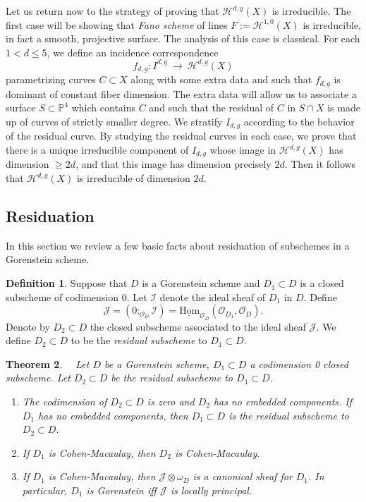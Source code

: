 \documentclass[twoside,12pt,reqno]{amsart}
\theoremstyle{plain}
\newtheorem{thm}{Theorem}[section]
\theoremstyle{definition}
\newtheorem{defn}[thm]{Definition}
\newcommand{\Hdg}[2]{\mathcal{H}^{#1,#2}}
\newcommand{\PP}{\mathbb{P}}
\def\ps{\vspace{4pt}}
\newcommand{\OO}{\mathcal O}
\begin{document}
\ps

Let us return now to the strategy of proving that $\Hdg{d}{g}(X)$ is
irreducible.  The first case will be showing that \emph{Fano scheme}
of lines $F:=\Hdg{1}{0}(X)$ is irreducible, in fact a smooth,
projective surface.  The analysis of this case is classical.  For each 
$1<d \leq 5$, we define an incidence correspondence
\begin{equation}
f_{d,g}:I^{d,g}~\rightarrow~\Hdg{d}{g}(X)
\end{equation}
parametrizing curves $C\subset X$ along with some extra data and 
such that $f_{d,g}$ is dominant of constant fiber dimension.  The
extra data will  
allow us to associate a surface $S\subset \PP^4$ which contains $C$
and such that the residual of $C$ in $S\cap X$ is made up of curves of 
strictly smaller degree.  We stratify $I_{d,g}$ according to the
behavior of the residual curve.  By studying the residual curves in
each case, we prove that there is a unique irreducible component of
$I_{d,g}$ whose image in $\Hdg{d}{g}(X)$ has dimension $\geq 2d$, and
that this image has dimension precisely $2d$.  Then it follows that
$\Hdg{d}{g}(X)$ is irreducible of dimension $2d$.

\subsection{Residuation} \label{sec-res}
In this section we review a few basic facts about residuation of
subschemes in a Gorenstein scheme.  

\ps

\begin{defn}  Suppose that $D$ is a Gorenstein scheme and
$D_1\subset D$ is a closed subscheme of codimension 0.  Let
$\mathcal{I}$ denote the ideal sheaf of $D_1$ in $D$.  Define
\begin{equation}
\mathcal{J} = (0:_{\OO_D} \mathcal{I}) =
\underline{\text{Hom}}_{\OO_D}( \OO_{D_1}, \OO_D).
\end{equation}  
Denote by
$D_2\subset D$ the closed subscheme associated to the ideal sheaf
$\mathcal{J}$.  We define $D_2\subset D$ to be the \emph{residual
subscheme} to $D_1\subset D$.  
\end{defn}

\ps

\begin{thm}~\cite[theorem 21.23]{E}~\label{thm-link}  Let $D$ be a
Gorenstein scheme, $D_1\subset D$ a codimension 0 closed subscheme.
Let $D_2\subset D$ be the residual subscheme to $D_1\subset D$.
\begin{enumerate}
\item The codimension of $D_2\subset D$ is zero and $D_2$ has no
embedded components.  If $D_1$ has no embedded components, then
$D_1\subset D$ is the residual subscheme to $D_2\subset D$.
\item If $D_1$ is Cohen-Macaulay, then $D_2$ is Cohen-Macaulay.
\item If $D_1$ is Cohen-Macaulay, then $\mathcal{J}\otimes\omega_D$ is
a canonical sheaf for $D_1$.  In particular, $D_1$ is Gorenstein iff
$\mathcal{J}$ is locally principal.
\end{enumerate}
\end{thm}
\end{document}

